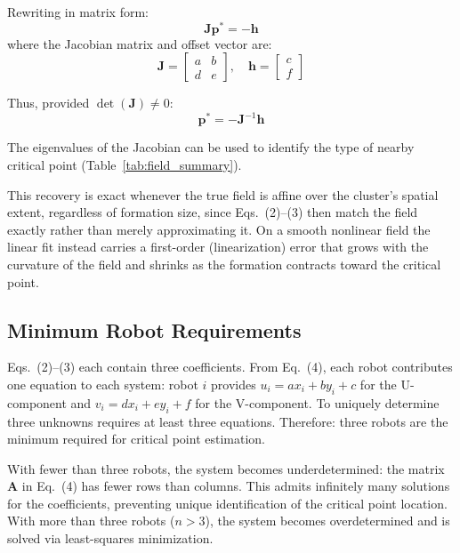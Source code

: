 \documentclass[lettersize,journal]{IEEEtran}
\begin{document}
Rewriting in matrix form:
\begin{equation}
\mathbf{J}\mathbf{p}^* = -\mathbf{h}
\end{equation}
where the Jacobian matrix and offset vector are:
\begin{equation}
\mathbf{J} = \begin{bmatrix} a & b \\ d & e \end{bmatrix}, \quad \mathbf{h} = \begin{bmatrix} c \\ f \end{bmatrix}
\end{equation}

Thus, provided $\det(\mathbf{J}) \neq 0$:
\begin{equation}
\mathbf{p}^* = -\mathbf{J}^{-1}\mathbf{h}
\end{equation}

The eigenvalues of the Jacobian can be used to identify the type of nearby critical point (Table~\ref{tab:field_summary}).

This recovery is exact whenever the true field is affine over the cluster's spatial extent, regardless of formation size, since Eqs.~(2)--(3) then match the field exactly rather than merely approximating it. On a smooth nonlinear field the linear fit instead carries a first-order (linearization) error that grows with the curvature of the field and shrinks as the formation contracts toward the critical point.


\subsection{Minimum Robot Requirements}

Eqs.~(2)--(3) each contain three coefficients. From Eq.~(4), each robot contributes one equation to each system: robot $i$ provides $u_i = ax_i + by_i + c$ for the U-component and $v_i = dx_i + ey_i + f$ for the V-component. To uniquely determine three unknowns requires at least three equations. Therefore: three robots are the minimum required for critical point estimation.

With fewer than three robots, the system becomes underdetermined: the matrix $\mathbf{A}$ in Eq.~(4) has fewer rows than columns. This admits infinitely many solutions for the coefficients, preventing unique identification of the critical point location. With more than three robots ($n > 3$), the system becomes overdetermined and is solved via least-squares minimization.
\end{document}
